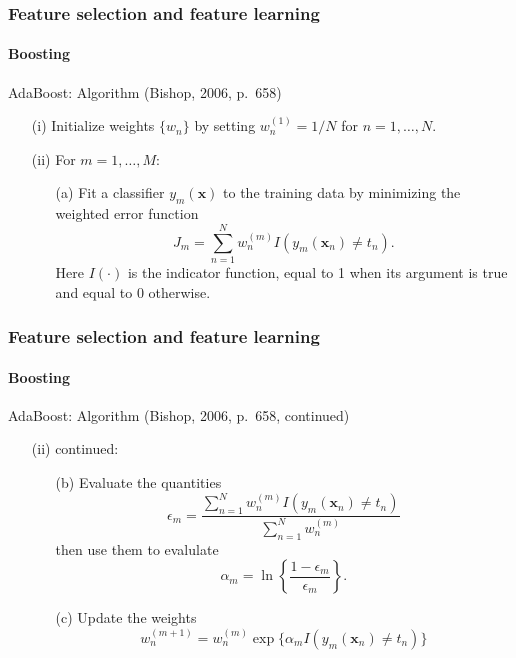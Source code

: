 \documentclass[aspectratio=169]{beamer}
\renewcommand{\vec}[1]{\boldsymbol{#1}}
\begin{document}
\begin{frame}
\frametitle{Feature selection and feature learning}
\framesubtitle{Boosting}

\begin{block}{AdaBoost: Algorithm (Bishop, 2006, p.\ 658)}
\begin{itemize}
\item[(i)] Initialize weights $\{w_n\}$ by setting $w_n^{(1)} = 1/N$
  for $n=1,\ldots,N$.
\item[(ii)] For $m=1,\ldots,M$:
  \begin{itemize}
  \item[(a)] Fit a classifier $y_m(\vec{x})$ to the training data by
    minimizing the weighted error function
    \begin{equation*}
    J_m=\sum_{n=1}^N w_n^{(m)}I(y_m(\vec{x}_n)\not= t_n).
    \end{equation*}
    Here $I(\cdot)$ is the indicator function, equal to 1 when its
    argument is true and equal to 0 otherwise.
  \end{itemize}
\end{itemize}
\end{block}

\end{frame}


\begin{frame}
\frametitle{Feature selection and feature learning}
\framesubtitle{Boosting}

\begin{block}{AdaBoost: Algorithm (Bishop, 2006, p.\ 658, continued)}
\begin{itemize}
\item[(ii)] continued:
  \begin{itemize}
  \item[(b)] Evaluate the quantities
    \begin{equation*}
    \epsilon_m=\frac{\sum_{n=1}^N w_n^{(m)}I(y_m(\vec{x}_n)\not=t_n)}
                    {\sum_{n=1}^N w_n^{(m)}}
    \end{equation*}
    then use them to evalulate
    \begin{equation*}
    \alpha_m = \ln\left\{\frac{1-\epsilon_m}{\epsilon_m}\right\}.
    \end{equation*}
  \item[(c)] Update the weights
    \begin{equation*}
    w_n^{(m+1)} = w_n^{(m)}\exp\{\alpha_m I(y_m(\vec{x}_n)\not=t_n)\}
    \end{equation*}
  \end{itemize}
\end{itemize}
\end{block}

\end{frame}
\end{document}
